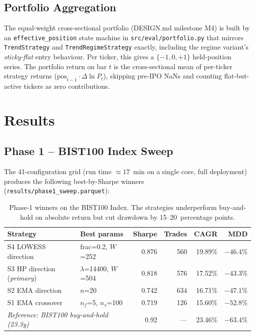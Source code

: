 \documentclass[11pt,a4paper]{article}
\begin{document}
\subsection{Portfolio Aggregation}\label{sec:portfolio-method}

The equal-weight cross-sectional portfolio (DESIGN.md milestone M4) is built
by an \texttt{effective\_position} state machine in
\texttt{src/eval/portfolio.py} that mirrors \texttt{TrendStrategy} and
\texttt{TrendRegimeStrategy} exactly, including the regime variant's
\emph{sticky-flat} entry behaviour. Per ticker, this gives a $\{-1,0,+1\}$
held-position series. The portfolio return on bar $t$ is the cross-sectional
mean of per-ticker strategy returns ($\text{pos}_{t-1} \cdot
\Delta\!\ln P_t$), skipping pre-IPO NaNs and counting flat-but-active tickers
as zero contributions.

\section{Results}\label{sec:results}

\subsection{Phase 1 -- BIST100 Index Sweep}

The 41-configuration grid (run time $\approx 17$~min on a single core, full
deployment) produces the following best-by-Sharpe winners
(\texttt{results/phase1\_sweep.parquet}):

\begin{table}[h]
\centering
\begin{tabular}{@{}llrrrr@{}}
\toprule
\textbf{Strategy} & \textbf{Best params} & \textbf{Sharpe} & \textbf{Trades} & \textbf{CAGR} & \textbf{MDD} \\
\midrule
S4 LOWESS direction          & frac=0.2, $W$=252       & 0.876 & 560 & 19.89\% & $-46.4\%$ \\
S3 HP direction (\emph{primary}) & $\lambda$=14400, $W$=504 & 0.818 & 576 & 17.52\% & $-43.3\%$ \\
S2 EMA direction              & $n$=20                  & 0.742 & 634 & 16.71\% & $-47.1\%$ \\
S1 EMA crossover              & $n_f$=5, $n_s$=100      & 0.719 & 126 & 15.60\% & $-52.8\%$ \\
\midrule
\multicolumn{2}{l}{\emph{Reference: BIST100 buy-and-hold (23.3y)}} & 0.92 & --- & 23.46\% & $-63.4\%$ \\
\bottomrule
\end{tabular}
\caption{Phase-1 winners on the BIST100 Index. The strategies underperform
buy-and-hold on absolute return but cut drawdown by 15--20~percentage points.}
\end{table}
\end{document}
